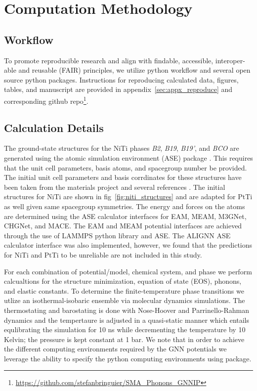 \documentclass[preprint,colorlinks=true,linkcolor=black,citecolor=black]{elsarticle}
\begin{document}
\section{Computation Methodology}
\label{sec:methods}

\subsection{Workflow}
\label{sec:workflow}
To promote reproducible research and align with findable, accessible, interoper-able and reusable (FAIR) principles\cite{Walsh2024}, we utilize \showyourwork python workflow\cite{Luger2021} and several open source python packages. Instructions for reproducing calculated data, figures, tables, and manuscript are provided in appendix~\ref{sec:appx_reproduce} and corresponding github repo\footnote{\url{https://github.com/stefanbringuier/SMA_Phonons_GNNIP}}.\par

\subsection{Calculation Details}
\label{sec:calc_details}
The ground-state structures for the NiTi phases \textit{B2}, \textit{B19}, \textit{B19'}, and \textit{BCO} are generated using the atomic simulation environment (ASE) package \cite{Larsen2017}. This requires that the unit cell parameters, basis atoms, and spacegroup number be provided. The initial unit cell parameters and basis corrdinates for these structures have been taken from the materials project \cite{Jain2013} and several references \cite{Haskins2016,Kadkhodaei2018}. The initial structures for NiTi are shown in fig~\ref{fig:niti_structures} and are adapted for PtTi as well given same spacegroup symmetries. The energy and forces on the atoms are determined using the ASE calculator interfaces for EAM, MEAM, M3GNet, CHGNet, and MACE.\cite{Mutter2010,Zhong2011,Ko2015,Kim2017,Chen2022,Deng2023,Batatia2022} The EAM and MEAM potential interfaces are achieved through the use of LAMMPS python library \cite{Thompson2022} and ASE. The ALIGNN ASE calculator interface was also implemented, however, we found that the predictions for NiTi and PtTi to be unreliable are not included in this study.\par

For each combination of potential/model, chemical system, and phase we perform calcualtions for the structure minimization, equation of state (EOS), phonons, and elastic constants. To determine the finite-temperature phase transitions we utlize an isothermal-isobaric ensemble via molecular dynamics simulations. The thermostating and barostating is done with Nose-Hoover and Parrinello-Rahman dynamics and the tempertaure is adjusted in a quasi-static manner which entails equlibrating the simulation for 10 ns while decrementing the temperature by 10 Kelvin; the pressure is kept constant at 1 bar. We note that in order to achieve the different computing environments required by the GNN potentials we leverage the ability to specify the python computing environments using \href{https://github.com/showyourwork/showyourwork}{\showyourwork} package.\par
\end{document}
